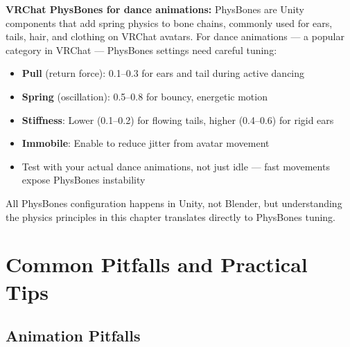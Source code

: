 \begin{furrybox}
\textbf{VRChat PhysBones for dance animations:} PhysBones are Unity components that add spring physics to bone chains, commonly used for ears, tails, hair, and clothing on VRChat avatars. For dance animations --- a popular category in VRChat --- PhysBones settings need careful tuning:

\begin{itemize}[leftmargin=1.5em]
  \item \textbf{Pull} (return force): 0.1--0.3 for ears and tail during active dancing
  \item \textbf{Spring} (oscillation): 0.5--0.8 for bouncy, energetic motion
  \item \textbf{Stiffness}: Lower (0.1--0.2) for flowing tails, higher (0.4--0.6) for rigid ears
  \item \textbf{Immobile}: Enable to reduce jitter from avatar movement
  \item Test with your actual dance animations, not just idle --- fast movements expose PhysBones instability
\end{itemize}

All PhysBones configuration happens in Unity, not Blender, but understanding the physics principles in this chapter translates directly to PhysBones tuning.
\end{furrybox}


\section{Common Pitfalls and Practical Tips}
\label{sec:anim-pitfalls}

\subsection{Animation Pitfalls}

